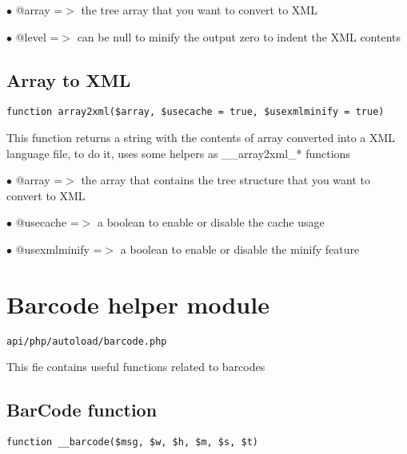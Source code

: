 \documentclass[a4paper]{book}
\begin{document}
\begin{compactitem}
\item[\color{myblue}$\bullet$] @array =$>$ the tree array that you want to convert to XML
\item[\color{myblue}$\bullet$] @level =$>$ can be null to minify the output zero to indent the XML contents
\end{compactitem}

\hypertarget{toc41}{}
\subsection{Array to XML}

\begin{lstlisting}
function array2xml($array, $usecache = true, $usexmlminify = true)
\end{lstlisting}

This function returns a string with the contents of array converted into a XML
language file, to do it, uses some helpers as \_\_array2xml\_* functions

\begin{compactitem}
\item[\color{myblue}$\bullet$] @array        =$>$ the array that contains the tree structure that you want to convert to XML
\item[\color{myblue}$\bullet$] @usecache     =$>$ a boolean to enable or disable the cache usage
\item[\color{myblue}$\bullet$] @usexmlminify =$>$ a boolean to enable or disable the minify feature
\end{compactitem}

\hypertarget{toc42}{}
\section{Barcode helper module}

\begin{lstlisting}
api/php/autoload/barcode.php
\end{lstlisting}

This fie contains useful functions related to barcodes

\hypertarget{toc43}{}
\subsection{BarCode function}

\begin{lstlisting}
function __barcode($msg, $w, $h, $m, $s, $t)
\end{lstlisting}
\end{document}
